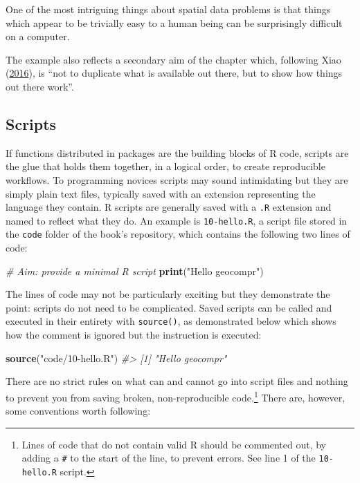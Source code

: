 \documentclass[]{krantz}
\newenvironment{Shaded}{\begin{snugshade}}{\end{snugshade}}
\newcommand{\CommentTok}[1]{\textcolor[rgb]{0.37,0.37,0.37}{\textit{#1}}}
\newcommand{\KeywordTok}[1]{\textcolor[rgb]{0.27,0.27,0.27}{\textbf{#1}}}
\newcommand{\NormalTok}[1]{#1}
\newcommand{\StringTok}[1]{\textcolor[rgb]{0.5,0.5,0.5}{#1}}
\let\rmarkdownfootnote\footnote%
\def\footnote{\protect\rmarkdownfootnote}
\renewenvironment{quote}{\begin{VF}}{\end{VF}}
\begin{document}
\begin{quote}
One of the most intriguing things about spatial data problems is that things which appear to be trivially easy to a human being can be surprisingly difficult on a computer.
\end{quote}

The example also reflects a secondary aim of the chapter which, following Xiao (\protect\hyperlink{ref-xiao_gis_2016}{2016}), is ``not to duplicate what is available out there, but to show how things out there work''.

\hypertarget{scripts}{%
\subsection{Scripts}\label{scripts}}

If functions distributed in packages are the building blocks of R code, scripts are the glue that holds them together, in a logical order, to create reproducible workflows.
To programming novices scripts may sound intimidating but they are simply plain text files, typically saved with an extension representing the language they contain.
R scripts are generally saved with a \texttt{.R} extension and named to reflect what they do.
An example is \texttt{10-hello.R}, a script file stored in the \texttt{code} folder of the book's repository, which contains the following two lines of code:

\begin{Shaded}
\begin{Highlighting}[]
\CommentTok{# Aim: provide a minimal R script}
\KeywordTok{print}\NormalTok{(}\StringTok{"Hello geocompr"}\NormalTok{)}
\end{Highlighting}
\end{Shaded}

The lines of code may not be particularly exciting but they demonstrate the point: scripts do not need to be complicated.
Saved scripts can be called and executed in their entirety with \texttt{source()}, as demonstrated below which shows how the comment is ignored but the instruction is executed:

\begin{Shaded}
\begin{Highlighting}[]
\KeywordTok{source}\NormalTok{(}\StringTok{"code/10-hello.R"}\NormalTok{)}
\CommentTok{#> [1] "Hello geocompr"}
\end{Highlighting}
\end{Shaded}

There are no strict rules on what can and cannot go into script files and nothing to prevent you from saving broken, non-reproducible code.\footnote{Lines of code that do not contain valid R should be commented out, by adding a \texttt{\#} to the start of the line, to prevent errors.
  See line 1 of the \texttt{10-hello.R} script.}
There are, however, some conventions worth following:
\end{document}
